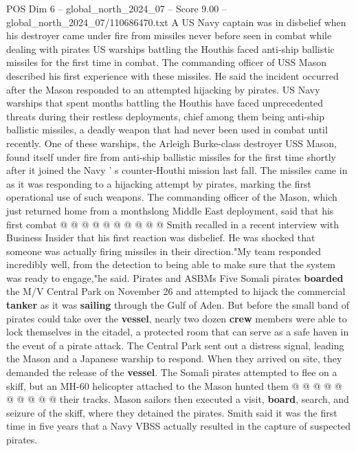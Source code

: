 \begin{textsample}{POS Dim 6 – global\_north\_2024\_07 – Score 9.00 – global\_north\_2024\_07/110686470.txt}  \label{ex:f6_pos_232}
A US Navy captain was in disbelief when his destroyer came under fire from missiles never before seen in combat while dealing with pirates US warships battling the Houthis faced anti-ship ballistic missiles for the first time in combat.
The commanding officer of USS Mason described his first experience with these missiles.
He said the incident occurred after the Mason responded to an attempted hijacking by pirates.
US Navy warships that spent months battling the Houthis have faced unprecedented threats during their restless deployments, chief among them being anti-ship ballistic missiles, a deadly weapon that had never been used in combat until recently.
One of these warships, the Arleigh Burke-class destroyer USS Mason, found itself under fire from anti-ship ballistic missiles for the first time shortly after it joined the Navy ' s counter-Houthi mission last fall.
The missiles came in as it was responding to a hijacking attempt by pirates, marking the first operational use of such weapons.
The commanding officer of the Mason, which just returned home from a monthslong Middle East deployment, said that his first combat @ @ @ @ @ @ @ @ @ @ Smith recalled in a recent interview with Business Insider that his first reaction was disbelief.
He was shocked that someone was actually firing missiles in their direction."My team responded incredibly well, from the detection to being able to make sure that the system was ready to engage,"he said.
Pirates and ASBMs Five Somali pirates \textbf{boarded} the M/V Central Park on November 26 and attempted to hijack the commercial \textbf{tanker} as it was \textbf{sailing} through the Gulf of Aden.
But before the small band of pirates could take over the \textbf{vessel}, nearly two dozen \textbf{crew} members were able to lock themselves in the citadel, a protected room that can serve as a safe haven in the event of a pirate attack.
The Central Park sent out a distress signal, leading the Mason and a Japanese warship to respond.
When they arrived on site, they demanded the release of the \textbf{vessel}.
The Somali pirates attempted to flee on a skiff, but an MH-60 helicopter attached to the Mason hunted them @ @ @ @ @ @ @ @ @ @ their tracks.
Mason sailors then executed a visit, \textbf{board}, search, and seizure of the skiff, where they detained the pirates.
Smith said it was the first time in five years that a Navy VBSS actually resulted in the capture of suspected pirates.

\end{textsample}
